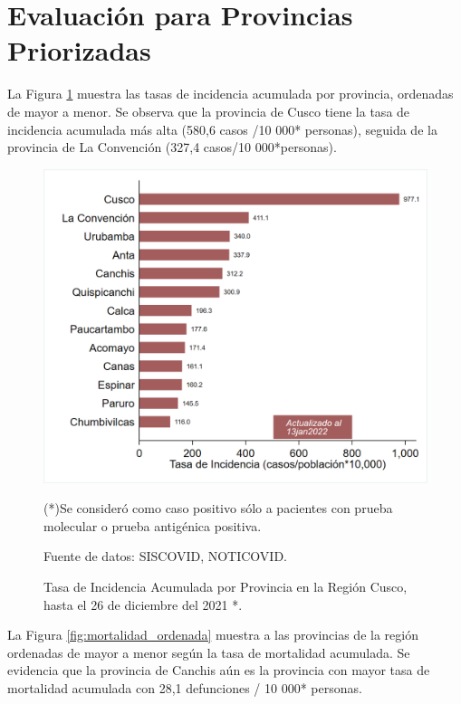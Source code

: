 \documentclass[12pt,a4paper,openany]{book}
\begin{document}
	\section*{Evaluación para Provincias Priorizadas}
\noindent La Figura \ref{fig:incidencia_provincias} muestra las tasas de incidencia acumulada por provincia, ordenadas de mayor a menor. Se observa que la provincia de Cusco tiene la tasa de incidencia acumulada más alta (580,6 casos /10 000* personas), seguida de la provincia de La Convención (327,4 casos/10 000*personas).

\begin{figure}[!htpb]
	\caption{Tasa de Incidencia Acumulada por Provincia en la Región Cusco, hasta el 26 de diciembre del 2021 *. }\label{fig:incidencia_provincias}
	\begin{center}
		\includegraphics[width=0.75\linewidth]{../figuras/incidencia_provincial}
	\end{center}
	{\footnotesize {(*)Se consideró como caso positivo sólo a pacientes con prueba molecular o prueba antigénica positiva. 
			
	Fuente de datos: SISCOVID, NOTICOVID.}}
\end{figure}


La Figura \ref{fig:mortalidad_ordenada} muestra a las provincias de la región ordenadas de mayor a menor según la tasa de mortalidad acumulada. Se evidencia que la provincia de Canchis aún es la provincia con mayor tasa de mortalidad acumulada con 28,1 defunciones / 10 000* personas.  
\end{document}
